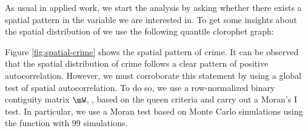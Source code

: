 As usual in applied work, we start the analysis by asking whether there exists a spatial pattern in the variable we are interested in. To get some insights about the spatial distribution of  we use the following quantile clorophet graph:

\begin{knitrout}
\color{fgcolor}\begin{kframe}
\begin{alltt}
 \hlstd{,}
        \hlstd{=} \hlopt{$}  \hlstd{=} \hlstd{(}\hlstd{,} \hlstd{,} \hlstd{,} \hlstd{,} \hlstd{),}  \hlstd{=} \hlstd{),}
        \hlstd{=} \hlstd{(}\hlstd{,} \hlstd{),}
        \hlstd{=} \hlstd{)}
\end{alltt}
\end{kframe}
\end{knitrout}

Figure \ref{fig:spatial-crime} shows the spatial pattern of crime. It can be observed that the spatial distribution of crime follows a clear pattern of positive autocorrelation. However, we must corroborate this statement by using a global test of spatial autocorrelation. To do so, we use a row-normalized binary contiguity matrix $\mW$, ,  based on the queen criteria and carry out a Moran's I test. In particular, we use a Moran test based on Monte Carlo simulations using the  function with 99 simulations. 

